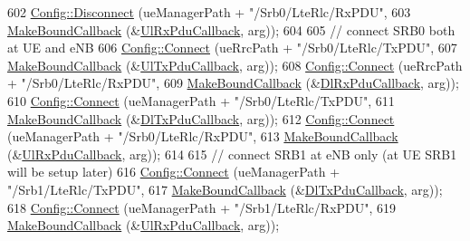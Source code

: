 \begin{DoxyCode}
602       \hyperlink{group__config_ga33e975bd2ed84e3353b2a3356d90fc1d}{Config::Disconnect} (ueManagerPath + \textcolor{stringliteral}{"/Srb0/LteRlc/RxPDU"},
603                           \hyperlink{group__makeboundcallback_ga1725d6362e6065faa0709f7c93f8d770}{MakeBoundCallback} (&\hyperlink{namespacens3_a269527c03607c9c885d7cff7667ec5e0}{UlRxPduCallback}, arg));
604 
605       \textcolor{comment}{// connect SRB0 both at UE and eNB}
606       \hyperlink{group__config_ga4014f151241cd0939b6cb64409605736}{Config::Connect} (ueRrcPath + \textcolor{stringliteral}{"/Srb0/LteRlc/TxPDU"},
607                        \hyperlink{group__makeboundcallback_ga1725d6362e6065faa0709f7c93f8d770}{MakeBoundCallback} (&\hyperlink{namespacens3_ae624428f0992ac62a3c5f2e7318fb98e}{UlTxPduCallback}, arg));
608       \hyperlink{group__config_ga4014f151241cd0939b6cb64409605736}{Config::Connect} (ueRrcPath + \textcolor{stringliteral}{"/Srb0/LteRlc/RxPDU"},
609                        \hyperlink{group__makeboundcallback_ga1725d6362e6065faa0709f7c93f8d770}{MakeBoundCallback} (&\hyperlink{namespacens3_ae4fb5123d8a56fce742428b530ec4197}{DlRxPduCallback}, arg));
610       \hyperlink{group__config_ga4014f151241cd0939b6cb64409605736}{Config::Connect} (ueManagerPath + \textcolor{stringliteral}{"/Srb0/LteRlc/TxPDU"},
611                        \hyperlink{group__makeboundcallback_ga1725d6362e6065faa0709f7c93f8d770}{MakeBoundCallback} (&\hyperlink{namespacens3_a7de82f7ed9986b9bcb67951f61e02ff4}{DlTxPduCallback}, arg));
612       \hyperlink{group__config_ga4014f151241cd0939b6cb64409605736}{Config::Connect} (ueManagerPath + \textcolor{stringliteral}{"/Srb0/LteRlc/RxPDU"},
613                        \hyperlink{group__makeboundcallback_ga1725d6362e6065faa0709f7c93f8d770}{MakeBoundCallback} (&\hyperlink{namespacens3_a269527c03607c9c885d7cff7667ec5e0}{UlRxPduCallback}, arg));
614 
615       \textcolor{comment}{// connect SRB1 at eNB only (at UE SRB1 will be setup later)}
616       \hyperlink{group__config_ga4014f151241cd0939b6cb64409605736}{Config::Connect} (ueManagerPath + \textcolor{stringliteral}{"/Srb1/LteRlc/TxPDU"},
617                        \hyperlink{group__makeboundcallback_ga1725d6362e6065faa0709f7c93f8d770}{MakeBoundCallback} (&\hyperlink{namespacens3_a7de82f7ed9986b9bcb67951f61e02ff4}{DlTxPduCallback}, arg));
618       \hyperlink{group__config_ga4014f151241cd0939b6cb64409605736}{Config::Connect} (ueManagerPath + \textcolor{stringliteral}{"/Srb1/LteRlc/RxPDU"},
619                        \hyperlink{group__makeboundcallback_ga1725d6362e6065faa0709f7c93f8d770}{MakeBoundCallback} (&\hyperlink{namespacens3_a269527c03607c9c885d7cff7667ec5e0}{UlRxPduCallback}, arg));

\end{DoxyCode}
